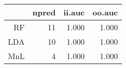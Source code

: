 \begin{table}[ht]
\centering
\begin{tabular}{rrrr}
  \hline
 & npred & ii.auc & oo.auc \\ 
  \hline
RF &   11 & 1.000 & 1.000 \\ 
  LDA &   10 & 1.000 & 1.000 \\ 
  MnL &    4 & 1.000 & 1.000 \\ 
   \hline
\end{tabular}
\label{tab:second_res}
\end{table}
